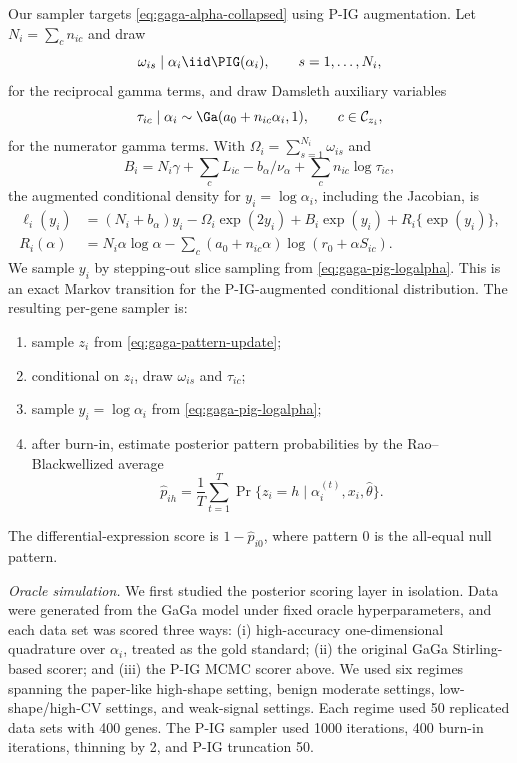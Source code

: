 Our sampler targets \eqref{eq:gaga-alpha-collapsed} using P-IG augmentation.
Let $N_i=\sum_c n_{ic}$ and draw
\[
\omega_{is}\mid \alpha_i \iid \PIG(\alpha_i),
\qquad s=1,\ldots,N_i,
\]
for the reciprocal gamma terms, and draw Damsleth auxiliary variables
\[
\tau_{ic}\mid \alpha_i \sim \Ga(a_0+n_{ic}\alpha_i,1),
\qquad c\in\mathcal{C}_{z_i},
\]
for the numerator gamma terms.  With
$\Omega_i=\sum_{s=1}^{N_i}\omega_{is}$ and
\[
B_i
=N_i\gamma+\sum_{c}L_{ic}-b_\alpha/\nu_\alpha
  +\sum_c n_{ic}\log\tau_{ic},
\]
the augmented conditional density for $y_i=\log\alpha_i$, including the
Jacobian, is
\begin{align}
\ell_i(y_i)
&=
(N_i+b_\alpha)y_i
-\Omega_i\exp(2y_i)
+B_i\exp(y_i)
+R_i\{\exp(y_i)\},
\label{eq:gaga-pig-logalpha}
\\
R_i(\alpha)
&=
N_i\alpha\log\alpha
-\sum_c(a_0+n_{ic}\alpha)\log(r_0+\alpha S_{ic}).
\nonumber
\end{align}
We sample $y_i$ by stepping-out slice sampling from
\eqref{eq:gaga-pig-logalpha}.  This is an exact Markov transition for the
P-IG-augmented conditional distribution.  The resulting per-gene sampler is:
\begin{enumerate}
\item sample $z_i$ from \eqref{eq:gaga-pattern-update};
\item conditional on $z_i$, draw $\omega_{is}$ and $\tau_{ic}$;
\item sample $y_i=\log\alpha_i$ from \eqref{eq:gaga-pig-logalpha};
\item after burn-in, estimate posterior pattern probabilities by the
Rao--Blackwellized average
\[
\widehat p_{ih}
=
\frac{1}{T}\sum_{t=1}^{T}
\Pr\{z_i=h\mid \alpha_i^{(t)},x_i,\widehat\theta\}.
\]
\end{enumerate}
The differential-expression score is $1-\widehat p_{i0}$, where pattern $0$
is the all-equal null pattern.

\textit{Oracle simulation.}
We first studied the posterior scoring layer in isolation.  Data were generated
from the GaGa model under fixed oracle hyperparameters, and each data set was
scored three ways: (i) high-accuracy one-dimensional quadrature over
$\alpha_i$, treated as the gold standard; (ii) the original GaGa
Stirling-based scorer; and (iii) the P-IG MCMC scorer above.  We used
six regimes spanning the paper-like high-shape setting, benign moderate
settings, low-shape/high-CV settings, and weak-signal settings.  Each regime
used 50 replicated data sets with 400 genes.  The P-IG sampler used 1000
iterations, 400 burn-in iterations, thinning by 2, and P-IG truncation 50.

